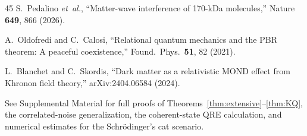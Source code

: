 \documentclass[prl,twocolumn,superscriptaddress,longbibliography,floatfix]{revtex4-2}
\begin{document}
\begin{thebibliography}{45}
S.~Pedalino \emph{et~al.},
``Matter-wave interference of 170-kDa molecules,''
Nature \textbf{649}, 866 (2026).

A.~Oldofredi and C.~Calosi,
``Relational quantum mechanics and the PBR theorem: A peaceful
coexistence,''
Found.\ Phys.\ \textbf{51}, 82 (2021).

L.~Blanchet and C.~Skordis,
``Dark matter as a relativistic MOND effect from Khronon field
theory,''
arXiv:2404.06584 (2024).

See Supplemental Material for full proofs of
Theorems~\ref{thm:extensive}--\ref{thm:KQ}, the correlated-noise
generalization, the coherent-state QRE calculation, and numerical
estimates for the Schr\"{o}dinger's cat scenario.

\end{thebibliography}
\end{document}
